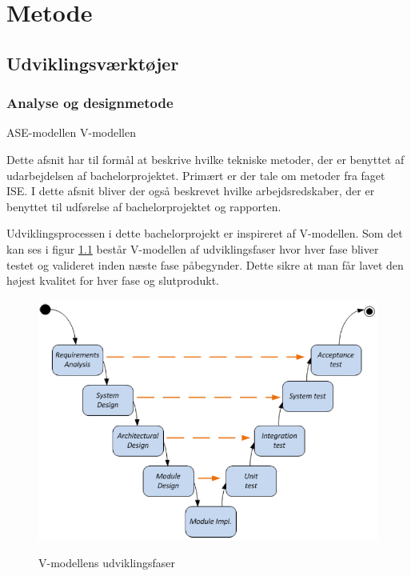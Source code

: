 \chapter{Metode}

\section{Udviklingsværktøjer}

\subsection{Analyse og designmetode}
ASE-modellen
V-modellen

Dette afsnit har til formål at beskrive hvilke tekniske metoder, der er benyttet af udarbejdelsen af bachelorprojektet. Primært er der tale om metoder fra faget ISE. I dette afsnit bliver der også beskrevet hvilke arbejdsredskaber, der er benyttet til udførelse af bachelorprojektet og rapporten.\\
\cite{}

Udviklingsprocessen i dette bachelorprojekt er inspireret af V-modellen. Som det kan ses i figur \ref{vmodel} består V-modellen af udviklingsfaser hvor hver fase bliver testet og valideret inden næste fase påbegynder. Dette sikre at man får lavet den højest kvalitet for hver fase og slutprodukt.
\begin{figure}[H]
\centering
{\includegraphics[width=\textwidth]
{Figure/vmodel}}
\caption{V-modellens udviklingsfaser\cite{IngenirhjskolenAarhusUniversitetVejledning2}}
\label{vmodel}
\end{figure}




